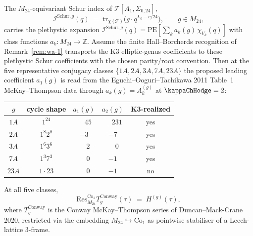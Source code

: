 \begin{theorem}%
\label{thm:wa-m24-equivariant-schur-five-classes}%
The $M_{24}$-equivariant Schur index of
$\mathcal T[A_1, \Sigma_{0, 24}]$,
\[
 \mathcal I^{\mathrm{Schur}, g}(q)
 \;=\; \mathrm{tr}_{\chi(\mathcal T)}\bigl(g \cdot q^{L_0 - c/24}\bigr),
 \qquad g \in M_{24},
\]
carries the plethystic expansion
$\mathcal I^{\mathrm{Schur}, g}(q) = \mathrm{PE}[\sum_k a_k(g)\,
\chi_{V_k}(q)]$ with class functions
$a_k\colon M_{24} \to \mathbb Z$. Assume the finite
Hall--Borcherds recognition of Remark~\ref{rem:wa-1} transports the
K3 elliptic-genus coefficients to these plethystic Schur coefficients
with the chosen parity/root convention. Then at the five representative
conjugacy classes $\{1A, 2A, 3A, 7A, 23A\}$ the proposed leading
coefficient $a_1(g)$ is read from the Eguchi--Ooguri--Tachikawa 2011
Table~1 McKay--Thompson data through
$a_k(g) = A_k^{(g)}$ at $\kappaChHodge = 2$:
\begin{center}
\begin{tabular}{c|c|c|c|c}
$g$ & cycle shape & $a_1(g)$ & $a_2(g)$ & K3-realized \\\hline
$1A$ & $1^{24}$ & $\phantom{-}45$ & $\phantom{-}231$ & yes \\
$2A$ & $1^8 2^8$ & $-3$ & $-7$ & yes \\
$3A$ & $1^6 3^6$ & $\phantom{-}2$ & $\phantom{-}0$ & yes \\
$7A$ & $1^3 7^3$ & $\phantom{-}0$ & $-1$ & yes \\
$23A$ & $1 \cdot 23$ & $\phantom{-}0$ & $-1$ & no \\
\end{tabular}
\end{center}
At all five classes,
\[
 \mathrm{Res}^{\mathrm{Co}_1}_{M_{24}} T_g^{\mathrm{Conway}}(\tau)
 \;=\; H^{(g)}(\tau),
\]
where $T_g^{\mathrm{Conway}}$ is the Conway McKay--Thompson
series of Duncan--Mack-Crane 2020, restricted via the embedding
$M_{24} \hookrightarrow \mathrm{Co}_1$ as pointwise stabiliser
of a Leech-lattice $3$-frame.
\end{theorem}

